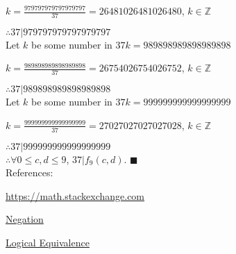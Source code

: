 \documentclass{article}
\begin{document}
$k = \frac{979797979797979797}{37} = 26481026481026480$, $k \in \mathbb{Z}$

$ \therefore  37|979797979797979797 $ \\

Let $k$ be some number in $37k = 989898989898989898$

$k = \frac{989898989898989898}{37} = 26754026754026752$, $k \in \mathbb{Z}$

$ \therefore  37|989898989898989898 $ \\

Let $k$ be some number in $37k = 999999999999999999$

$k = \frac{999999999999999999}{37} = 27027027027027028$, $k \in \mathbb{Z}$

$ \therefore  37|999999999999999999 $ \\

$ \therefore \forall 0 \leq c,d \leq 9$, $37|f_9(c,d)$. $\blacksquare$ \\

References:

\href{https://math.stackexchange.com/questions/304217/is-forall-x-exists-y-qx-y-the-same-as-exists-y-forall-x-qx-y}{https://math.stackexchange.com}

\href{https://www.math.toronto.edu/preparing-for-calculus/3_logic/we_3_negation.html}{Negation}

\href{https://www.csm.ornl.gov/~sheldon/ds/sec1.1.html}{Logical Equivalence}
\end{document}
